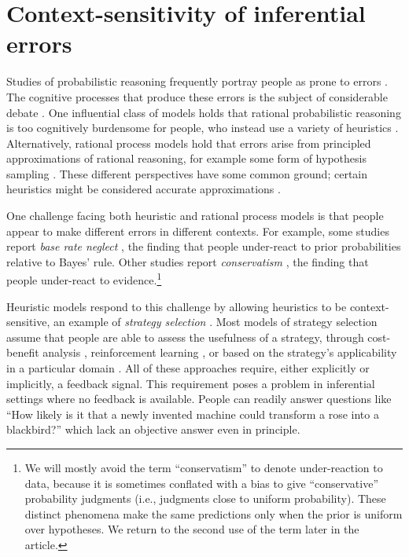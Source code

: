 \section{Context-sensitivity of inferential errors}

Studies of probabilistic reasoning frequently portray people as prone to errors \citep{tversky1974judgment,slovic1971comparison,grether1980bayes,fischhoff1983hypothesis}. The cognitive processes that produce these errors is the subject of considerable debate \citep{mellers2001frequency,gigerenzer1996narrow,samuels2012ending}. One influential class of models holds that rational probabilistic reasoning is too cognitively burdensome for people, who instead use a variety of heuristics \citep{tversky1974judgment,gigerenzer1996reasoning,shah2008heuristics}. Alternatively, rational process models hold that errors arise from principled approximations of rational reasoning, for example some form of hypothesis sampling \citep{dasgupta2017hypotheses,sanborn2016bayesian,griffiths2012bridging}. These different perspectives have some common ground; certain heuristics might be considered accurate approximations \citep{gigerenzer2009homo,parpart2018heuristics,belousov2016catching}.

One challenge facing both heuristic and rational process models is that people appear to make different errors in different contexts. For example, some studies report \emph{base rate neglect} \citep{bar1980base,birnbaum1983base,grether1980bayes,kahneman1973psychology}, the finding that people under-react to prior probabilities relative to Bayes' rule. Other studies report \emph{conservatism} \citep{phillips1966conservatism, peterson1965sensitivity}, the finding that people under-react to evidence.\footnote{We will mostly avoid the term ``conservatism'' to denote under-reaction to data, because it is sometimes conflated with a bias to give ``conservative'' probability judgments (i.e., judgments close to uniform probability). These distinct phenomena make the same predictions only when the prior is uniform over hypotheses. We return to the second use of the term later in the article.}

Heuristic models respond to this challenge by allowing heuristics to be context-sensitive, an example of \emph{strategy selection} \citep{gigerenzer2008heuristics,marewski2014strategy}. Most models of strategy selection assume that people are able to assess the usefulness of a strategy, through cost-benefit analysis \citep{johnson85,beach1978contingency,lieder2017strategy}, reinforcement learning \citep{erev05,rieskamp06}, or based on the strategy's applicability in a particular domain \citep{marewski2011cognitive,schulz2016simple}. All of these approaches require, either explicitly or implicitly, a feedback signal. This requirement poses a problem in inferential settings where no feedback is available. People can readily answer questions like ``How likely is it that a newly invented machine could transform a rose into a blackbird?'' \citep{Griffiths15} which lack an objective answer even in principle.  

